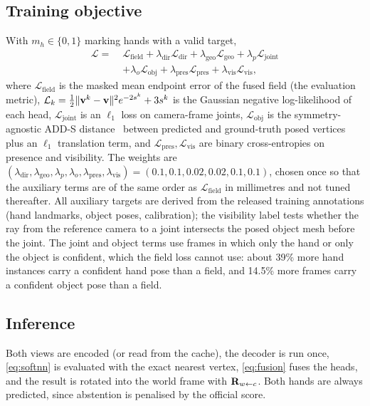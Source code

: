 \subsection{Training objective}
\label{sec:loss}
With $m_h\in\{0,1\}$ marking hands with a valid target,
\begin{equation}
\begin{aligned}
  \mathcal{L}=\;&\mathcal{L}_{\text{field}}+\lambda_{\text{dir}}\mathcal{L}_{\text{dir}}+\lambda_{\text{geo}}\mathcal{L}_{\text{geo}}+\lambda_{p}\mathcal{L}_{\text{joint}}\\
  &+\lambda_{o}\mathcal{L}_{\text{obj}}+\lambda_{\text{pres}}\mathcal{L}_{\text{pres}}+\lambda_{\text{vis}}\mathcal{L}_{\text{vis}},
\end{aligned}
  \label{eq:loss}
\end{equation}
where $\mathcal{L}_{\text{field}}$ is the masked mean endpoint error of the fused field (the evaluation metric), $\mathcal{L}_{k}=\tfrac{1}{2}\|\mathbf{v}^{k}-\mathbf{v}\|^2e^{-2s^{k}}+3s^{k}$ is the Gaussian negative log-likelihood of each head, $\mathcal{L}_{\text{joint}}$ is an $\ell_1$ loss on camera-frame joints, $\mathcal{L}_{\text{obj}}$ is the symmetry-agnostic ADD-S distance~\cite{xiang2018posecnn,hodan2020bop} between predicted and ground-truth posed vertices plus an $\ell_1$ translation term, and $\mathcal{L}_{\text{pres}},\mathcal{L}_{\text{vis}}$ are binary cross-entropies on presence and visibility. The weights are $(\lambda_{\text{dir}},\lambda_{\text{geo}},\lambda_{p},\lambda_{o},\lambda_{\text{pres}},\lambda_{\text{vis}})=(0.1,0.1,0.02,0.02,0.1,0.1)$, chosen once so that the auxiliary terms are of the same order as $\mathcal{L}_{\text{field}}$ in millimetres and not tuned thereafter. All auxiliary targets are derived from the released training annotations (hand landmarks, object poses, calibration); the visibility label tests whether the ray from the reference camera to a joint intersects the posed object mesh before the joint. The joint and object terms use frames in which only the hand or only the object is confident, which the field loss cannot use: about 39\% more hand instances carry a confident hand pose than a field, and 14.5\% more frames carry a confident object pose than a field.

\subsection{Inference}
Both views are encoded (or read from the cache), the decoder is run once, \cref{eq:softnn} is evaluated with the exact nearest vertex, \cref{eq:fusion} fuses the heads, and the result is rotated into the world frame with $\mathbf{R}_{w\leftarrow c}$. Both hands are always predicted, since abstention is penalised by the official score.
